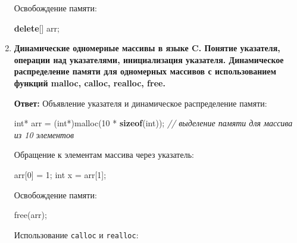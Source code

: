 \documentclass[
]{article}
\newenvironment{Shaded}{}{}
\newcommand{\CommentTok}[1]{\textcolor[rgb]{0.38,0.63,0.69}{\textit{#1}}}
\newcommand{\DataTypeTok}[1]{\textcolor[rgb]{0.56,0.13,0.00}{#1}}
\newcommand{\DecValTok}[1]{\textcolor[rgb]{0.25,0.63,0.44}{#1}}
\newcommand{\KeywordTok}[1]{\textcolor[rgb]{0.00,0.44,0.13}{\textbf{#1}}}
\newcommand{\NormalTok}[1]{#1}
\newcommand{\OperatorTok}[1]{\textcolor[rgb]{0.40,0.40,0.40}{#1}}
\begin{document}
\begin{enumerate}
  Освобождение памяти:

\begin{Shaded}
\begin{Highlighting}[]
\KeywordTok{delete}\OperatorTok{[]}\NormalTok{ arr}\OperatorTok{;}
\end{Highlighting}
\end{Shaded}
\item
  \textbf{Динамические одномерные массивы в языке C. Понятие указателя,
  операции над указателями, инициализация указателя. Динамическое
  распределение памяти для одномерных массивов с использованием функций
  malloc, calloc, realloc, free.}

  \textbf{Ответ:} Объявление указателя и динамическое распределение
  памяти:

\begin{Shaded}
\begin{Highlighting}[]
\DataTypeTok{int}\OperatorTok{*}\NormalTok{ arr }\OperatorTok{=} \OperatorTok{(}\DataTypeTok{int}\OperatorTok{*)}\NormalTok{malloc}\OperatorTok{(}\DecValTok{10} \OperatorTok{*} \KeywordTok{sizeof}\OperatorTok{(}\DataTypeTok{int}\OperatorTok{));} \CommentTok{// выделение памяти для массива из 10 элементов}
\end{Highlighting}
\end{Shaded}

  Обращение к элементам массива через указатель:

\begin{Shaded}
\begin{Highlighting}[]
\NormalTok{arr}\OperatorTok{[}\DecValTok{0}\OperatorTok{]} \OperatorTok{=} \DecValTok{1}\OperatorTok{;}
\DataTypeTok{int}\NormalTok{ x }\OperatorTok{=}\NormalTok{ arr}\OperatorTok{[}\DecValTok{1}\OperatorTok{];}
\end{Highlighting}
\end{Shaded}

  Освобождение памяти:

\begin{Shaded}
\begin{Highlighting}[]
\NormalTok{free}\OperatorTok{(}\NormalTok{arr}\OperatorTok{);}
\end{Highlighting}
\end{Shaded}

  Использование \texttt{calloc} и \texttt{realloc}:


\end{enumerate}
\end{document}
